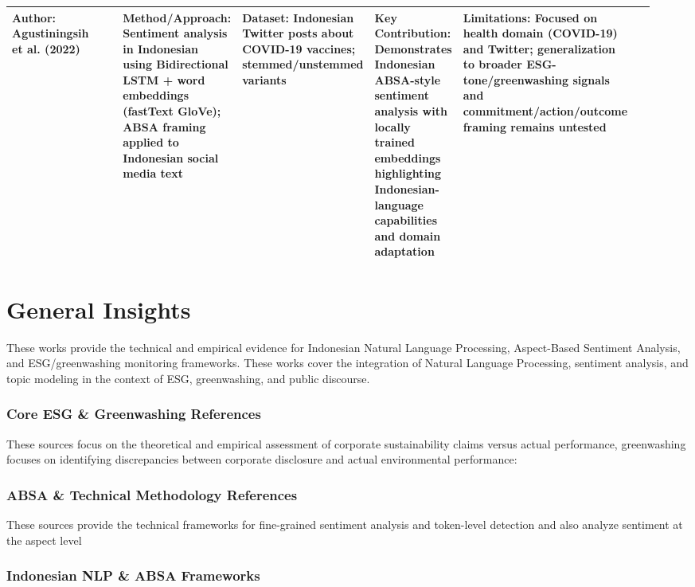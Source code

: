 \documentclass{article}
\begin{document}
\begin{landscape}
\begin{longtable}{p{0.134\linewidth} p{0.134\linewidth} p{0.134\linewidth} p{0.134\linewidth} p{0.134\linewidth} p{0.134\linewidth} p{0.134\linewidth}}
Author: Agustiningsih et al. (2022) & ~ & Method/Approach: Sentiment analysis in Indonesian using Bidirectional LSTM + word embeddings (fastText GloVe); ABSA framing applied to Indonesian social media text & Dataset: Indonesian Twitter posts about COVID-19 vaccines; stemmed/unstemmed variants & Key Contribution: Demonstrates Indonesian ABSA-style sentiment analysis with locally trained embeddings highlighting Indonesian-language capabilities and domain adaptation & Limitations: Focused on health domain (COVID-19) and Twitter; generalization to broader ESG-tone/greenwashing signals and commitment/action/outcome framing remains untested \\ \hline

\end{longtable}

\end{landscape}
\section*{General Insights}

These works provide the technical and empirical evidence for Indonesian Natural Language Processing, Aspect-Based Sentiment Analysis, and ESG/greenwashing monitoring frameworks. These works cover the integration of Natural Language Processing, sentiment analysis, and topic modeling in the context of ESG, greenwashing, and public discourse.
\subsubsection*{Core ESG \& Greenwashing References}

These sources focus on the theoretical and empirical assessment of corporate sustainability claims versus actual performance, greenwashing focuses on identifying discrepancies between corporate disclosure and actual environmental performance:
\subsubsection*{ABSA \& Technical Methodology References}

These sources provide the technical frameworks for fine-grained sentiment analysis and token-level detection and also analyze sentiment at the aspect level
\subsubsection*{Indonesian NLP \& ABSA Frameworks}
\end{document}
